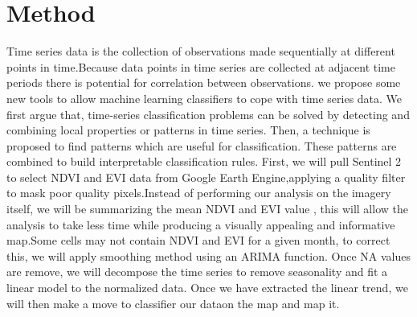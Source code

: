 \documentclass[10pt]{report}
\newenvironment{Shaded}{\begin{snugshade}}{\end{snugshade}}
\newcommand{\AttributeTok}[1]{\textcolor[rgb]{0.77,0.63,0.00}{#1}}
\newcommand{\CommentTok}[1]{\textcolor[rgb]{0.56,0.35,0.01}{\textit{#1}}}
\newcommand{\FunctionTok}[1]{\textcolor[rgb]{0.00,0.00,0.00}{#1}}
\newcommand{\NormalTok}[1]{#1}
\newcommand{\OtherTok}[1]{\textcolor[rgb]{0.56,0.35,0.01}{#1}}
\newcommand{\SpecialCharTok}[1]{\textcolor[rgb]{0.00,0.00,0.00}{#1}}
\newcommand{\StringTok}[1]{\textcolor[rgb]{0.31,0.60,0.02}{#1}}
\begin{document}
\hypertarget{method}{%
\section{Method}\label{method}}

Time series data is the collection of observations made sequentially at
different points in time.Because data points in time series are
collected at adjacent time periods there is potential for correlation
between observations. we propose some new tools to allow machine
learning classifiers to cope with time series data. We first argue that,
time-series classification problems can be solved by detecting and
combining local properties or patterns in time series. Then, a technique
is proposed to find patterns which are useful for classification. These
patterns are combined to build interpretable classification rules.
First, we will pull Sentinel 2 to select NDVI and EVI data from Google
Earth Engine,applying a quality filter to mask poor quality
pixels.Instead of performing our analysis on the imagery itself, we will
be summarizing the mean NDVI and EVI value , this will allow the
analysis to take less time while producing a visually appealing and
informative map.Some cells may not contain NDVI and EVI for a given
month, to correct this, we will apply smoothing method using an ARIMA
function. Once NA values are remove, we will decompose the time series
to remove seasonality and fit a linear model to the normalized data.
Once we have extracted the linear trend, we will then make a move to
classifier our dataon the map and map it.

\begin{Shaded}
\end{Shaded}
\end{document}
